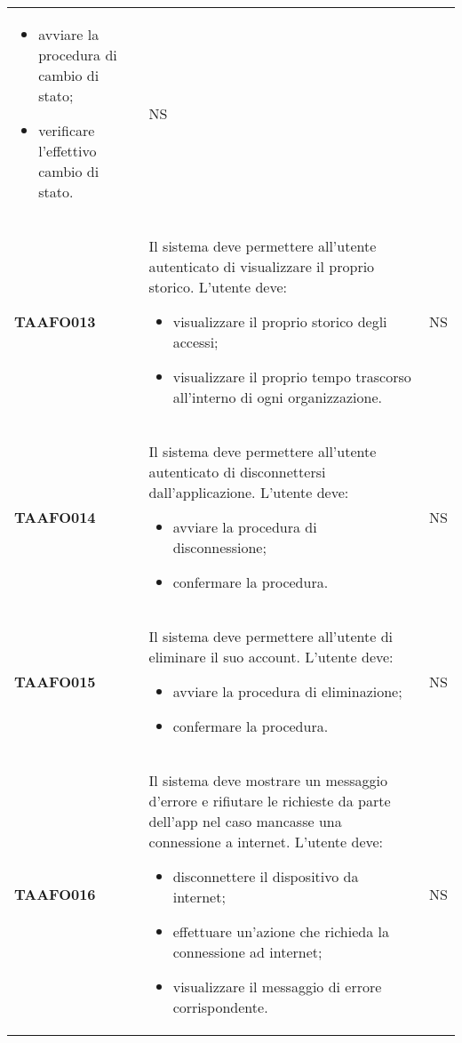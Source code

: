 \documentclass[../piano-di-qualifica.tex]{subfiles}
\begin{document}
\begin{centering}
\begin{longtable}[H]{>{\centering\bfseries}m{3cm} >{}p{10cm} >{\centering\arraybackslash}m{3cm}}
                      \begin{itemize}
                        \item avviare la procedura di cambio di stato;
                        \item verificare l'effettivo cambio di stato.
                      \end{itemize}
                      & NS \\
        TAAFO013      & Il sistema deve permettere all'utente autenticato di visualizzare il proprio storico. \newline
                      L'utente deve:
                      \begin{itemize}
                        \item visualizzare il proprio storico degli accessi;
                        \item visualizzare il proprio tempo trascorso all'interno di ogni organizzazione.
                      \end{itemize}
                      & NS \\
        TAAFO014      & Il sistema deve permettere all'utente autenticato di disconnettersi dall'applicazione. \newline
                      L'utente deve:
                      \begin{itemize}
                        \item avviare la procedura di disconnessione;
                        \item confermare la procedura.
                      \end{itemize}
                      & NS \\
        TAAFO015      & Il sistema deve permettere all'utente di eliminare il suo account. \newline
                      L'utente deve:
                      \begin{itemize}
                        \item avviare la procedura di eliminazione;
                        \item confermare la procedura.
                      \end{itemize}
                      & NS \\
        TAAFO016      & Il sistema deve mostrare un messaggio d'errore e rifiutare le richieste da parte dell'app nel caso mancasse una connessione a internet. \newline
                      L'utente deve:
                      \begin{itemize}
                        \item disconnettere il dispositivo da internet;
                        \item effettuare un'azione che richieda la connessione ad internet;
                        \item visualizzare il messaggio di errore corrispondente.
                      \end{itemize}
                      & NS \\


\end{longtable}
\end{centering}
\end{document}
